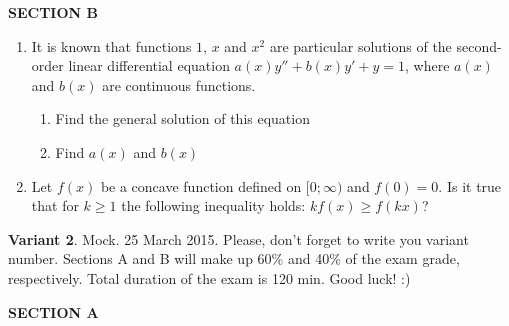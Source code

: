 \documentclass[12pt,a4paper]{article}
\begin{document}
\textbf{SECTION B}

\begin{enumerate}[resume]

\item It is known that functions $1$, $x$ and $x^2$  are particular solutions of the second-order linear differential equation  $a(x)y''+b(x)y'+y=1$,  where $a(x)$  and $b(x)$  are continuous functions.
\begin{enumerate}
\item  Find the general solution of this equation
\item  Find $a(x)$ and  $b(x)$
\end{enumerate}
\item Let $f(x)$ be a concave function defined on $[0;\infty)$  and $f(0)=0$. Is it true that for $k \geq 1$ the following inequality holds: $kf(x)\geq f(kx)$?


\end{enumerate}
\newpage

\thispagestyle{empty}
\textbf{Variant 2}. Mock. 25 March 2015. Please, don't forget to write you variant number. Sections A and B will make up 60\% and 40\% of the exam grade, respectively. Total duration of the exam is 120 min. Good luck! :) 



\textbf{SECTION A}
\end{document}
